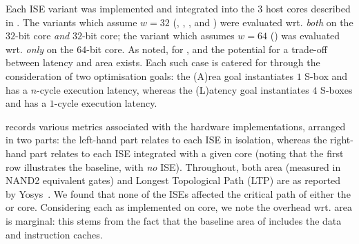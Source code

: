 
Each ISE variant was implemented and integrated into the $3$ host cores 
described in .
The variants which assume  $w = 32$
(, , , and ) 
were evaluated wrt.
{\em both}
on the
$32$-bit  core
{\em  and}
$32$-bit  core;
the variant  which assumes $w = 64$
()
was  evaluated wrt.
{\em only}
on the
$64$-bit  core.
As noted, for ,  and  the potential for a trade-off
between latency and area exists.  Each such case is catered for through
the consideration of two optimisation goals:
the (A)rea    goal
instantiates $1$ S-box   and has a $n$-cycle execution latency,
whereas
the (L)atency goal
instantiates $4$ S-boxes and has a $1$-cycle execution latency.

records
various metrics 
associated with the hardware implementations, 
arranged in two parts: 
the  left-hand part relates to each ISE in isolation,
whereas 
the right-hand part relates to each ISE integrated with a given core
(noting that the first row illustrates the baseline, with {\em no} ISE).
Throughout, both area (measured in NAND2 equivalent gates) and Longest 
Topological Path (LTP) are as reported by Yosys~\cite{yosys}.  We found 
that none of the ISEs affected the critical path of either the  
or  core.
Considering each as implemented on  core, we note the overhead
wrt. area is marginal: this stems from the fact that the baseline area
of  includes the data and instruction caches.

